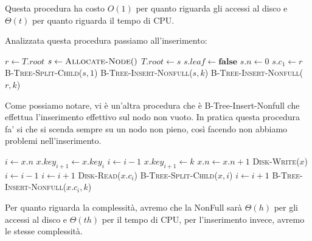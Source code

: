 Questa procedura ha costo $O(1)$ per quanto riguarda gli accessi al disco e $\Theta(t)$ per quanto riguarda il tempo di CPU.

Analizzata questa procedura passiamo all'inserimento:
\begin{algorithm}[H]
\caption{B-TREE-INSERT($T$, $k$)}
\begin{algorithmic}[1]
    \State $r \gets T.root$
        \State $s \gets \textsc{Allocate-Node}()$ 
        \State $T.root \gets s$ 
        \State $s.leaf \gets \textbf{false}$ 
        \State $s.n \gets 0$
        \State $s.c_1 \gets r$ 
        \State \textsc{B-Tree-Split-Child}($s, 1$) 
        \State \textsc{B-Tree-Insert-Nonfull}($s, k$) 
    \Else
        \State \textsc{B-Tree-Insert-Nonfull}($r, k$) 
    \EndIf
\end{algorithmic}
\end{algorithm}

Come possiamo notare, vi è un'altra procedura che è B-Tree-Insert-Nonfull che effettua l'inserimento effettivo sul nodo non vuoto. In pratica questa procedura fa' si che si scenda sempre su un nodo non pieno, così facendo non abbiamo problemi nell'inserimento.
\begin{algorithm}[H]
\caption{B-TREE-INSERT-NONFULL($x$, $k$)}
\begin{algorithmic}[1]
    \State $i \gets x.n$
     
            \State $x.key_{i+1} \gets x.key_i$ 
            \State $i \gets i - 1$
        \EndWhile
        \State $x.key_{i+1} \gets k$ 
        \State $x.n \gets x.n + 1$
        \State \textsc{Disk-Write}($x$)
    \Else
         
            \State $i \gets i - 1$
        \EndWhile
        \State $i \gets i + 1$
        \State \textsc{Disk-Read}($x.c_i$)
         
            \State \textsc{B-Tree-Split-Child}($x, i$)
                \State $i \gets i + 1$
            \EndIf
        \EndIf
        \State \textsc{B-Tree-Insert-Nonfull}($x.c_i, k$) 
    \EndIf
\end{algorithmic}
\end{algorithm}
Per quanto riguarda la complessità, avremo che la NonFull sarà $\Theta(h)$ per gli accessi al disco e $\Theta(th)$ per il tempo di CPU, per l'inserimento invece, avremo le stesse complessità. 

